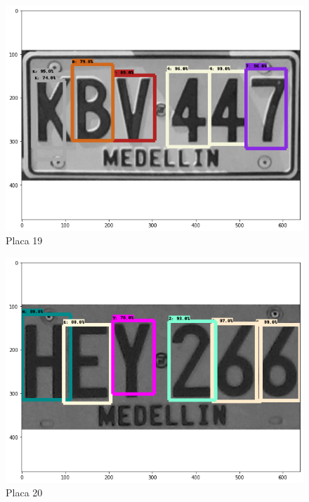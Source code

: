 \begin{figure}[H]
\centering
\includegraphics[width=0.4\linewidth]{imagenes/caracteres detectados/nuevo entrenamiento/19.png}
\caption{Placa 19}
\label{fig:caracteres detectados p23}
\end{figure}



\begin{table}[H]
    \centering
    \caption{Detección de caracteres con porcentajes de acierto placa 19}
    \label{tab:p23}
\end{table}


\begin{figure}[H]
\centering
\includegraphics[width=0.4\linewidth]{imagenes/caracteres detectados/nuevo entrenamiento/22.png}
\caption{Placa 20}
\label{fig:caracteres detectados p24}
\end{figure}

